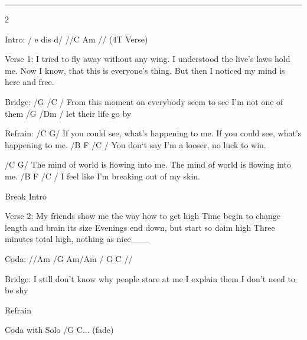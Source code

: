 \noindent\rule{\columnwidth}{1pt}

\begin{multicols}{2}
\begin{lstsong}
Intro: /   e  dis d/
       //C Am // (4T Verse)

Verse 1:
I tried to fly away without any wing.
I understood the live's laws hold me.
Now I know, that this is everyone's thing.
But then I noticed my mind is here and free.

Bridge:
/G              /C /	
From this moment on
everybody seem to see
I'm not one of them
     /G          /Dm /
let their life go by  

Refrain:
/C G/
If you could see,
what's happening to me.
If you could see,
what's happening to me.
/B F /C /
You don`t say I'm a looser,	
no luck to win.

/C G/
The mind of world
is flowing into me.
The mind of world
is flowing into me.
/B F /C /
I feel like I'm 
breaking out of my skin.

Break Intro
	
Verse 2:
My friends show me the way how to get high
Time begin to change length and brain its size
Evenings end down, but start so daim high
Three minutes total high, nothing as nice___

Coda: //Am /G Am/Am / G C //

Bridge:
I still don't know why
people stare at me
I explain them I
don't need to be shy

Refrain

Coda with Solo
/G C... (fade)
\end{lstsong}
\end{multicols}
\newpage

